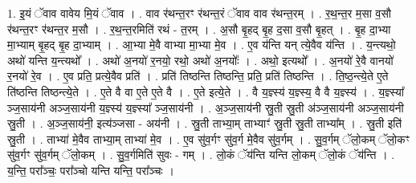 \documentclass[17pt]{extarticle}
\begin{document}
1. इ॒यं ॅवाव वावेय मि॒यं ॅवाव । . वाव र॑थन्त॒रꣳ र॑थन्त॒रं ॅवाव वाव र॑थन्त॒रम् । . र॒थ॒न्त॒र म॒सा व॒सौ र॑थन्त॒रꣳ र॑थन्त॒र म॒सौ । . र॒थ॒न्त॒रमिति॑ रथं - त॒रम् । . अ॒सौ बृ॒हद् बृ॒ह द॒सा व॒सौ बृ॒हत् । . बृ॒ह दा॒भ्या मा॒भ्याम् बृ॒हद् बृ॒ह दा॒भ्याम् । . आ॒भ्या मे॒वै वाभ्या मा॒भ्या मे॒व । . ए॒व य॑न्ति यन् त्ये॒वैव य॑न्ति । . य॒न्त्यथो॒ अथो॑ यन्ति य॒न्त्यथो᳚ । . अथो॑ अ॒नयो॑ र॒नयो॒ रथो॒ अथो॑ अ॒नयोः᳚ । . अथो॒ इत्यथो᳚ । . अ॒नयो॑ रे॒वै वानयो॑ र॒नयो॑ रे॒व । . ए॒व प्रति॒ प्रत्ये॒वैव प्रति॑ । . प्रति॑ तिष्ठन्ति तिष्ठन्ति॒ प्रति॒ प्रति॑ तिष्ठन्ति । . ति॒ष्ठ॒न्त्ये॒ते ए॒ते ति॑ष्ठन्ति तिष्ठन्त्ये॒ते । . ए॒ते वै वा ए॒ते ए॒ते वै । . ए॒ते इत्ये॒ते । . वै य॒ज्ञ्स्य॑ य॒ज्ञ्स्य॒ वै वै य॒ज्ञ्स्य॑ । . य॒ज्ञ्स्या᳚ ञ्ज॒साय॑नी अञ्ज॒साय॑नी य॒ज्ञ्स्य॑ य॒ज्ञ्स्या᳚ ञ्ज॒साय॑नी । . अ॒ञ्ज॒साय॑नी स्रु॒ती स्रु॒ती अ॑ञ्ज॒साय॑नी अञ्ज॒साय॑नी स्रु॒ती । . अ॒ञ्ज॒साय॑नी॒ इत्य॑ञ्जसा - अय॑नी । . स्रु॒ती ताभ्या॒म् ताभ्याꣳ॑ स्रु॒ती स्रु॒ती ताभ्या᳚म् । . स्रु॒ती इति॑ स्रु॒ती । . ताभ्या॑ मे॒वैव ताभ्या॒म् ताभ्या॑ मे॒व । . ए॒व सु॑व॒र्गꣳ सु॑व॒र्ग मे॒वैव सु॑व॒र्गम् । . सु॒व॒र्गम् ॅलो॒कम् ॅलो॒कꣳ सु॑व॒र्गꣳ सु॑व॒र्गम् ॅलो॒कम् । . सु॒व॒र्गमिति॑ सुवः - गम् । . लो॒कं ॅय॑न्ति यन्ति लो॒कम् ॅलो॒कं ॅय॑न्ति । . य॒न्ति॒ परा᳚ञ्चः॒ परा᳚ञ्चो यन्ति यन्ति॒ परा᳚ञ्चः । \newline
\end{document}
